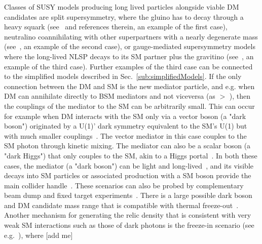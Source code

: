 Classes of SUSY models producing long lived particles alongside viable DM candidates are split supersymmetry, where the gluino has to decay through a heavy squark (see~\cite{Masiero:2004ft} and references therein, an example of the first case), neutralino coannihilating with other superpartners with a nearly degenerate mass (see~\cite{Ellis:1999mm}, an example of the second case), or gauge-mediated supersymmetry models where the long-lived NLSP decays to its SM partner plus the gravitino (see~\cite{Dimopoulos:1996vz}, an example of the third case). 
Further examples of the third case can be connected to the simplified models described in Sec.~\ref{sub:simplifiedModels}. If the only connection between the DM and SM is the new mediator particle, and e.g. when DM can annihilate directly to BSM mediators and not viceversa (as \mdm $>$ \mmed), then the couplings of the mediator to the SM can be arbitrarily small. This can occur for example when DM interacts with the SM only via a vector boson (a "dark boson") originated by a U(1)' dark symmetry equivalent to the SM's U(1) but with much smaller couplings~\cite{Holdom:1985ag}. The vector mediator in this case couples to the SM photon through kinetic mixing. The mediator can also be a scalar boson (a "dark Higgs") that only couples to the SM, akin to a Higgs portal~\cite{Curtin:2014cca}. %
In both these cases, the mediator (a "dark boson") can be light and long-lived~\cite{Pospelov:2007mp}, and its visible decays into SM particles or associated production with a SM boson provide the main collider handle~\cite{Curtin:2014cca}. These scenarios can also be probed by complementary beam dump and fixed target experiments~\cite{Battaglieri:2017aum}. 
There is a large possible dark boson and DM candidate mass range that is compatible with thermal freeze-out~\cite{Das:2010ts}. Another mechanism for generating the relic density that is consistent with very weak SM interactions such as those of dark photons is the freeze-in scenario (see e.g.~\cite{Co:2015pka,Bernal:2017kxu}), where [add me]

